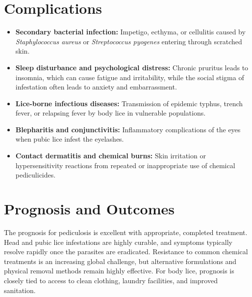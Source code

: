 \section*{Complications}
\begin{itemize}
    \item \textbf{Secondary bacterial infection:} Impetigo, ecthyma, or cellulitis caused by \textit{Staphylococcus aureus} or \textit{Streptococcus pyogenes} entering through scratched skin.
    \item \textbf{Sleep disturbance and psychological distress:} Chronic pruritus leads to insomnia, which can cause fatigue and irritability, while the social stigma of infestation often leads to anxiety and embarrassment.
    \item \textbf{Lice-borne infectious diseases:} Transmission of epidemic typhus, trench fever, or relapsing fever by body lice in vulnerable populations.
    \item \textbf{Blepharitis and conjunctivitis:} Inflammatory complications of the eyes when pubic lice infest the eyelashes.
    \item \textbf{Contact dermatitis and chemical burns:} Skin irritation or hypersensitivity reactions from repeated or inappropriate use of chemical pediculicides.
\end{itemize}

\section*{Prognosis and Outcomes}
The prognosis for pediculosis is excellent with appropriate, completed treatment. Head and pubic lice infestations are highly curable, and symptoms typically resolve rapidly once the parasites are eradicated. Resistance to common chemical treatments is an increasing global challenge, but alternative formulations and physical removal methods remain highly effective. For body lice, prognosis is closely tied to access to clean clothing, laundry facilities, and improved sanitation.

